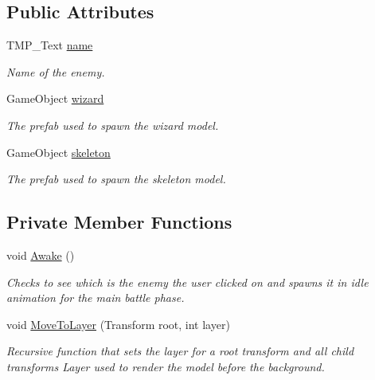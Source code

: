 \subsection*{Public Attributes}
\begin{DoxyCompactItemize}
\item 
T\+M\+P\+\_\+\+Text \mbox{\hyperlink{class_enemy_controller_aef0e1e53df1d60d8593064278827ce6a}{name}}
\begin{DoxyCompactList}\small\item\em Name of the enemy. \end{DoxyCompactList}\item 
Game\+Object \mbox{\hyperlink{class_enemy_controller_af94df5444352df3bd0751887b7e39c94}{wizard}}
\begin{DoxyCompactList}\small\item\em The prefab used to spawn the wizard model. \end{DoxyCompactList}\item 
Game\+Object \mbox{\hyperlink{class_enemy_controller_a553a3551c8acbbc10c03de3d63f4671f}{skeleton}}
\begin{DoxyCompactList}\small\item\em The prefab used to spawn the skeleton model. \end{DoxyCompactList}\end{DoxyCompactItemize}
\subsection*{Private Member Functions}
\begin{DoxyCompactItemize}
\item 
void \mbox{\hyperlink{class_enemy_controller_af64c9a5242284f2b4794e8e471e60f4c}{Awake}} ()
\begin{DoxyCompactList}\small\item\em Checks to see which is the enemy the user clicked on and spawns it in idle animation for the main battle phase. \end{DoxyCompactList}\item 
void \mbox{\hyperlink{class_enemy_controller_a461addd95c41f6c754415cc6ef660856}{Move\+To\+Layer}} (Transform root, int layer)
\begin{DoxyCompactList}\small\item\em Recursive function that sets the layer for a root transform and all child transforms Layer used to render the model before the background. \end{DoxyCompactList}\end{DoxyCompactItemize}
